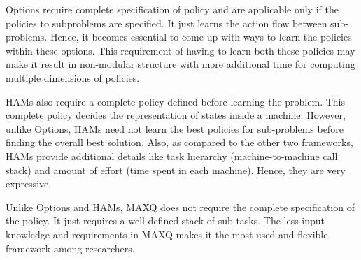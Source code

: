 Options require complete specification of policy and are applicable only if the policies to subproblems are specified. It just learns the action flow between sub-problems. Hence, it becomes essential to come up with ways to learn the policies within these options.  This requirement of having to learn both these policies may make it result in non-modular structure with more additional time for computing multiple dimensions of policies. 

HAMs also require a complete policy defined before learning the problem. This complete policy decides the representation of states inside a machine. However, unlike Options, HAMs need not learn the best policies for sub-problems before finding the overall best solution. Also, as compared to the other two frameworks, HAMs provide additional details like task hierarchy (machine-to-machine call stack) and amount of effort (time spent in each machine). Hence, they are very expressive. 

Unlike Options and HAMs, MAXQ does not require the complete specification of the policy. It just requires a well-defined stack of sub-tasks. The less input knowledge and requirements in MAXQ makes it the most used and flexible framework among researchers.
